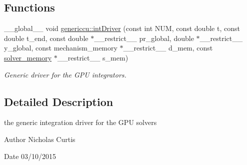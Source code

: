\subsection*{Functions}
\begin{DoxyCompactItemize}
\item 
\+\_\+\+\_\+global\+\_\+\+\_\+ void \hyperlink{namespacegenericcu_aff46876594be0dced04cee0173535519}{genericcu\+::int\+Driver} (const int N\+UM, const double t, const double t\+\_\+end, const double $\ast$\+\_\+\+\_\+restrict\+\_\+\+\_\+ pr\+\_\+global, double $\ast$\+\_\+\+\_\+restrict\+\_\+\+\_\+ y\+\_\+global, const mechanism\+\_\+memory $\ast$\+\_\+\+\_\+restrict\+\_\+\+\_\+ d\+\_\+mem, const \hyperlink{structsolver__memory}{solver\+\_\+memory} $\ast$\+\_\+\+\_\+restrict\+\_\+\+\_\+ s\+\_\+mem)
\begin{DoxyCompactList}\small\item\em Generic driver for the G\+PU integrators. \end{DoxyCompactList}\end{DoxyCompactItemize}


\subsection{Detailed Description}
the generic integration driver for the G\+PU solvers 

\begin{DoxyAuthor}{Author}
Nicholas Curtis 
\end{DoxyAuthor}
\begin{DoxyDate}{Date}
03/10/2015 
\end{DoxyDate}

